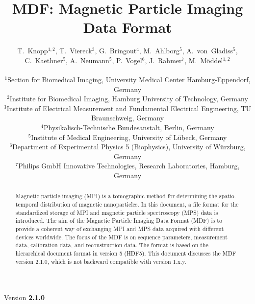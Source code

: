 \documentclass[landscape,a4paper]{article} %
\begin{document}
\title{MDF: Magnetic Particle Imaging Data Format}
\newcommand{\version}{2.1.0}

\author{
T.~Knopp$^{1,2}$, T.~Viereck$^3$, G.~Bringout$^4$, M.~Ahlborg$^5$, A.~von~Gladiss$^5$, C.~Kaethner$^5$, A.~Neumann$^5$, P.~Vogel$^6$, J.~Rahmer$^7$, M.~M\"oddel$^{1,2}$ \\ \\
$^1$Section for Biomedical Imaging, University Medical Center Hamburg-Eppendorf, Germany\\
$^2$Institute for Biomedical Imaging, Hamburg University of Technology, Germany\\
$^3$Institute of Electrical Measurement and Fundamental Electrical Engineering, TU Braunschweig, Germany\\
$^4$Physikalisch-Technische Bundesanstalt, Berlin, Germany\\
$^5$Institute of Medical Engineering, University of  Lübeck, Germany\\
$^6$Department of Experimental Physics 5 (Biophysics), University of Würzburg, Germany\\
$^7$Philips GmbH Innovative Technologies, Research Laboratories, Hamburg, Germany
}

\maketitle
\begin{center}
Version \textbf{\version}
\end{center}

\begin{abstract}
Magnetic particle imaging (MPI) is a tomographic method for determining the spatio-temporal distribution of magnetic nanoparticles. In this document, a file format for the standardized storage of MPI and magnetic particle spectroscopy (MPS) data is introduced. The aim of the Magnetic Particle Imaging Data Format (MDF) is to provide a coherent way of exchanging MPI and MPS data acquired with different devices worldwide. The focus of the MDF is on sequence parameters, measurement data, calibration data, and reconstruction data. The format is based on the hierarchical document format in version 5 (HDF5). This document discusses the MDF version \version, which is not backward compatible with version 1.x.y.
\end{abstract}
\end{document}
